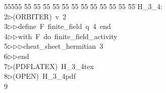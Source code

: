 %
%
\begin{tabbing}
55555 \= 55 \= 55 \= 55 \= 55 \= 55 \= 55 \= 55 \= 55 \= 55 \= 55 \= 55 \= 55 \= \>H\_3\_4:\\[0pt]
2\>$\triangleright$\>(ORBITER)\ v\ 2\ \\[0pt]
3\>$\triangleright$\>$\triangleright$\>define\ F\ finite\_field\ q\ 4\ end\ \\[0pt]
4\>$\triangleright$\>$\triangleright$\>with\ F\ do\ finite\_field\_activity\ \\[0pt]
5\>$\triangleright$\>$\triangleright$\>$\triangleright$\>cheat\_sheet\_hermitian\ 3\ \\[0pt]
6\>$\triangleright$\>$\triangleright$\>end\\[0pt]
7\>$\triangleright$\>(PDFLATEX)\ H\_3\_4tex\ \\[0pt]
8\>$\triangleright$\>(OPEN)\ H\_3\_4pdf\\[0pt]
9\>\end{tabbing}
